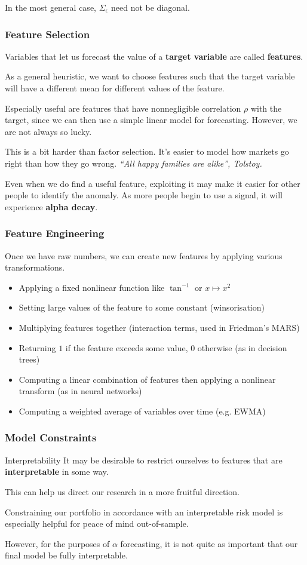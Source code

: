 \documentclass{article}
\begin{document}
In the most general case, $\Sigma_\epsilon$ need not be diagonal.

\subsubsection{Feature Selection}
Variables that let us forecast the value of a \textbf{target variable} are called \textbf{features}.

As a general heuristic, we want to choose features such that the target variable will have a different mean for different values of the feature.

Especially useful are features that have nonnegligible correlation $\rho$ with the target, since we can then use a simple linear model for forecasting. However, we are not always so lucky.

This is a bit harder than factor selection. It's easier to model how markets go right than how they go wrong. \textit{``All happy families are alike'', Tolstoy.}

Even when we do find a useful feature, exploiting it may make it easier for other people to identify the anomaly. As more people begin to use a signal, it will experience \textbf{alpha decay}.

\subsubsection{Feature Engineering}
Once we have raw numbers, we can create new features by applying various transformations.
\begin{itemize}
	\item Applying a fixed nonlinear function like $\tan^{-1}$ or $x\mapsto x^2$
	\item Setting large values of the feature to some constant (winsorisation)
	\item Multiplying features together (interaction terms, used in Friedman's MARS)
	\item Returning $1$ if the feature exceeds some value, $0$ otherwise (as in decision trees)
	\item Computing a linear combination of features then applying a nonlinear transform (as in neural networks) 
	\item Computing a weighted average of variables over time (e.g. EWMA)
\end{itemize}

\subsubsection{Model Constraints}
\begin{block}{Interpretability}
	It may be desirable to restrict ourselves to features that are \textbf{interpretable} in some way.

	This can help us direct our research in a more fruitful direction.

	Constraining our portfolio in accordance with an interpretable risk model is especially helpful for peace of mind out-of-sample.

	However, for the purposes of $\alpha$ forecasting, it is not quite as important that our final model be fully interpretable.
\end{block}
\end{document}
